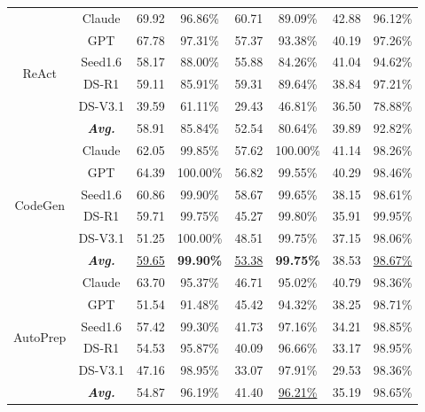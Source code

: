 \begin{table}[t]
{\begin{tabular}{|c|c||c|c|c|c|c|c|}
      \multirow{6}{*}{ReAct} 
      & Claude & 69.92 & 96.86\% & 60.71 & 89.09\% & 42.88 & 96.12\% \\
      & GPT & 67.78 & 97.31\% & 57.37 & 93.38\% & 40.19 & 97.26\% \\
      & Seed1.6 & 58.17 & 88.00\% & 55.88 & 84.26\% & 41.04 & 94.62\% \\
      & DS-R1 & 59.11 & 85.91\% & 59.31 & 89.64\% & 38.84 & 97.21\% \\
      & DS-V3.1 & 39.59 & 61.11\% & 29.43 & 46.81\% & 36.50 & 78.88\% \\ 
      \rowcolor{gray!15} \cellcolor{white} & \textbf{\textit{Avg.}} & 58.91 & 85.84\% & 52.54 & 80.64\% & 39.89 & 92.82\% \\ \hline

      \multirow{6}{*}{{CodeGen}} 
      & Claude & 62.05 & 99.85\% & 57.62 & 100.00\% & 41.14 & 98.26\% \\
      & GPT & 64.39 & 100.00\% & 56.82 & 99.55\% & 40.29 & 98.46\% \\
      & Seed1.6 & 60.86 & 99.90\% & 58.67 & 99.65\% & 38.15 & 98.61\% \\
      & DS-R1 & 59.71 & 99.75\% & 45.27 & 99.80\% & 35.91 & 99.95\% \\
      & DS-V3.1 & 51.25 & 100.00\% & 48.51 & 99.75\% & 37.15 & 98.06\% \\ 
      \rowcolor{gray!15} \cellcolor{white} & \textbf{\textit{Avg.}} & \underline{59.65} & \textbf{99.90\%} & \underline{53.38} & \textbf{99.75\%} & 38.53 & \underline{98.67\%} \\ \hline

      \multirow{6}{*}{AutoPrep} 
      & Claude & 63.70 & 95.37\% & 46.71 & 95.02\% & 40.79 & 98.36\% \\
      & GPT & 51.54 & 91.48\% & 45.42 & 94.32\% & 38.25 & 98.71\% \\
      & Seed1.6 & 57.42 & 99.30\% & 41.73 & 97.16\% & 34.21 & 98.85\% \\
      & DS-R1 & 54.53 & 95.87\% & 40.09 & 96.66\% & 33.17 & 98.95\% \\
      & DS-V3.1 & 47.16 & 98.95\% & 33.07 & 97.91\% & 29.53 & 98.36\% \\ 
      \rowcolor{gray!15} \cellcolor{white} & \textbf{\textit{Avg.}} & 54.87 & 96.19\% & 41.40 & \underline{96.21\%} & 35.19 & 98.65\% \\ \hline\hline


\end{tabular}}
\end{table}
